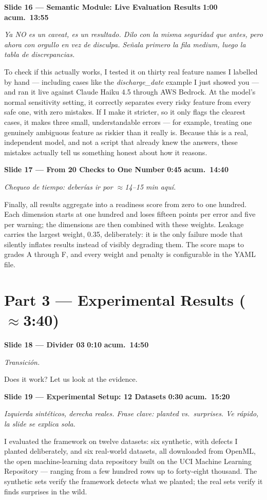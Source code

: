 \documentclass[11pt,a4paper]{article}
\newcommand{\slide}[6]{%
\begin{mdframed}[backgroundcolor=paleBlue, linecolor=upmBlue, linewidth=1pt,
                 roundcorner=4pt, skipabove=10pt, skipbelow=2pt,
                 innertopmargin=6pt, innerbottommargin=6pt]
\textbf{\color{upmBlue}Slide #1 --- #2}\hfill
\colorbox{upmOrange}{\color{white}\small\textbf{ #3 }}\;%
\colorbox{upmBlue}{\color{white}\small\textbf{ acum.\ #4 }}
\end{mdframed}
{\small\itshape\color{grayTxt}#5}\par\vspace{2pt}
#6\par\vspace{6pt}}
\begin{document}
\slide{16}{Semantic Module: Live Evaluation Results}{1:00}{13:55}
{Ya NO es un caveat, es un resultado. Dilo con la misma seguridad que antes,
pero ahora con orgullo en vez de disculpa. Señala primero la fila medium,
luego la tabla de discrepancias.}
{To check if this actually works, I tested it on thirty real feature names I
labelled by hand --- including cases like the \emph{discharge\_date} example
I just showed you --- and ran it live against Claude Haiku 4.5 through AWS
Bedrock. At the model's normal sensitivity setting, it correctly separates
every risky feature from every safe one, with zero mistakes. If I make it
stricter, so it only flags the clearest cases, it makes three small,
understandable errors --- for example, treating one genuinely ambiguous
feature as riskier than it really is. Because this is a real, independent
model, and not a script that already knew the answers, these mistakes
actually tell us something honest about how it reasons.}

\slide{17}{From 20 Checks to One Number}{0:45}{14:40}
{Chequeo de tiempo: deberías ir por $\approx$14--15 min aquí.}
{Finally, all results aggregate into a readiness score from zero to one
hundred. Each dimension starts at one hundred and loses fifteen points per
error and five per warning; the dimensions are then combined with these
weights. Leakage carries the largest weight, 0.35, deliberately: it is the
only failure mode that silently inflates results instead of visibly degrading
them. The score maps to grades A through F, and every weight and penalty is
configurable in the YAML file.}

\section*{\color{upmBlue}Part 3 --- Experimental Results (\normalfont$\approx$3:40)}

\slide{18}{Divider 03}{0:10}{14:50}
{Transición.}
{Does it work? Let us look at the evidence.}

\slide{19}{Experimental Setup: 12 Datasets}{0:30}{15:20}
{Izquierda sintéticos, derecha reales. Frase clave: planted vs.\ surprises.
Ve rápido, la slide se explica sola.}
{I evaluated the framework on twelve datasets: six synthetic, with defects I
planted deliberately, and six real-world datasets, all downloaded from
OpenML, the open machine-learning data repository built on the UCI Machine
Learning Repository --- ranging from a few hundred rows up to forty-eight
thousand. The synthetic sets verify the
framework detects what we planted; the real sets verify it finds surprises
in the wild.}
\end{document}
